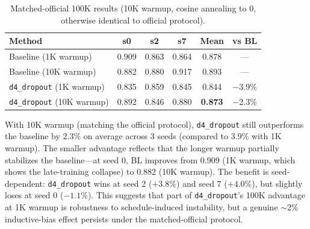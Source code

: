 \documentclass{article}
\begin{document}
\begin{table}[H]
\centering
\caption{Matched-official 100K results (10K warmup, cosine annealing to 0, otherwise identical to official protocol).}
\label{tab:matched_official}
\small
\begin{tabular}{lccccc}
\toprule
\textbf{Method} & \textbf{s0} & \textbf{s2} & \textbf{s7} & \textbf{Mean} & \textbf{vs BL} \\
\midrule
Baseline (1K warmup) & 0.909 & 0.863 & 0.864 & 0.878 & --- \\
Baseline (10K warmup) & 0.882 & 0.880 & 0.917 & 0.893 & --- \\
\midrule
\texttt{d4\_dropout} (1K warmup) & 0.835 & 0.859 & 0.845 & 0.844 & $-3.9\%$ \\
\texttt{d4\_dropout} (10K warmup) & 0.892 & 0.846 & 0.880 & \textbf{0.873} & $\mathbf{-2.3\%}$ \\
\bottomrule
\end{tabular}
\end{table}

With 10K warmup (matching the official protocol), \texttt{d4\_dropout} still outperforms the baseline by $2.3\%$ on average across 3 seeds (compared to $3.9\%$ with 1K warmup). The smaller advantage reflects that the longer warmup partially stabilizes the baseline---at seed 0, BL improves from 0.909 (1K warmup, which shows the late-training collapse) to 0.882 (10K warmup). The benefit is seed-dependent: \texttt{d4\_dropout} wins at seed 2 ($+3.8\%$) and seed 7 ($+4.0\%$), but slightly loses at seed 0 ($-1.1\%$). This suggests that part of \texttt{d4\_dropout}'s 100K advantage at 1K warmup is robustness to schedule-induced instability, but a genuine $\sim$2\% inductive-bias effect persists under the matched-official protocol.
\end{document}
